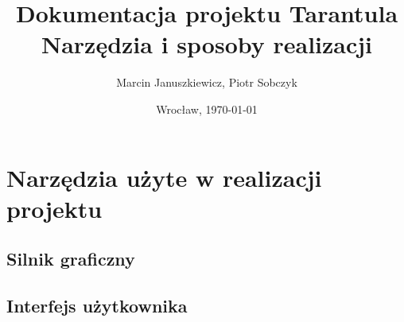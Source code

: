 \documentclass[11pt,leqno]{article}
\title{\LARGE Dokumentacja projektu \textbf{Tarantula}\\
							Narzędzia i sposoby realizacji}
\author{Marcin Januszkiewicz, Piotr Sobczyk}
\date{Wrocław, \today}
\begin{document}
\maketitle 
\newpage
\tableofcontents
\newpage
\pagestyle{headings}

\section{Narzędzia użyte w realizacji projektu}

\subsection{Silnik graficzny}


\subsection{Interfejs użytkownika}
\end{document}
